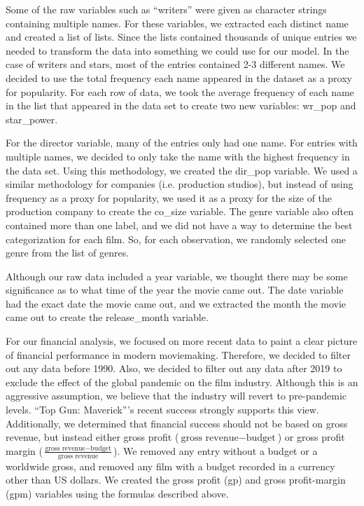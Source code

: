 \documentclass[10pt]{article}
\begin{document}
Some of the raw variables such as “writers” were given as character strings containing multiple names. For these variables, we extracted each distinct name and created a list of lists. Since the lists contained thousands of unique entries we needed to transform the data into something we could use for our model. In the case of writers and stars, most of the entries contained 2-3 different names. We decided to use the total frequency each name appeared in the dataset as a proxy for popularity. For each row of data, we took the average frequency of each name in the list that appeared in the data set to create two new variables: wr\_pop and star\_power.

For the director variable, many of the entries only had one name. For entries with multiple names, we decided to only take the name with the highest frequency in the data set. Using this methodology, we created the dir\_pop variable. We used a similar methodology for companies (i.e. production studios), but instead of using frequency as a proxy for popularity, we used it as a proxy for the size of the production company to create the co\_size variable. The genre variable also often contained more than one label, and we did not have a way to determine the best categorization for each film. So, for each observation, we randomly selected one genre from the list of genres.

Although our raw data included a year variable, we thought there may be some significance as to what time of the year the movie came out. The date variable had the exact date the movie came out, and we extracted the month the movie came out to create the release\_month variable.

For our financial analysis, we focused on more recent data to paint a clear picture of financial performance in modern moviemaking. Therefore, we decided to filter out any data before 1990. Also, we decided to filter out any data after 2019 to exclude the effect of the global pandemic on the film industry. Although this is an aggressive assumption, we believe that the industry will revert to pre-pandemic levels. “Top Gun: Maverick”’s recent success strongly supports this view. Additionally, we determined that financial success should not be based on gross revenue, but instead either gross profit ($\text{gross revenue} - \text{budget}$) or gross profit margin ($\frac{\text{gross revenue} - \text{budget}}{\text{gross revenue}}$). We removed any entry without a budget or a worldwide gross, and removed any film with a budget recorded in a currency other than US dollars. We created the gross profit (gp) and gross profit-margin (gpm) variables using the formulas described above. 
\end{document}
